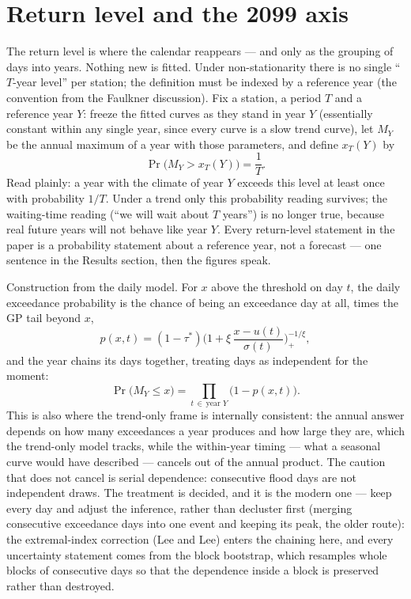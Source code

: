 \documentclass[11pt]{article}
\begin{document}
\section{Return level and the 2099 axis}\label{sec:rl}

The return level is where the calendar reappears --- and only as the grouping of days into years. Nothing new is fitted. Under non-stationarity there is no single ``$T$-year level'' per station; the definition must be indexed by a reference year (the convention from the Faulkner discussion). Fix a station, a period $T$ and a reference year $Y$: freeze the fitted curves as they stand in year $Y$ (essentially constant within any single year, since every curve is a slow trend curve), let $M_Y$ be the annual maximum of a year with those parameters, and define $x_T(Y)$ by
\begin{equation}\label{eq:rl}
\Pr\bigl(M_Y > x_T(Y)\bigr) = \frac{1}{T}.
\end{equation}
Read plainly: a year with the climate of year $Y$ exceeds this level at least once with probability $1/T$. Under a trend only this probability reading survives; the waiting-time reading (``we will wait about $T$ years'') is no longer true, because real future years will not behave like year $Y$. Every return-level statement in the paper is a probability statement about a reference year, not a forecast --- one sentence in the Results section, then the figures speak.

Construction from the daily model. For $x$ above the threshold on day $t$, the daily exceedance probability is the chance of being an exceedance day at all, times the GP tail beyond $x$,
\begin{equation}\label{eq:pxt}
p(x, t) = (1 - \tau^{*}) \biggl(1 + \xi\, \frac{x - u(t)}{\sigma(t)}\biggr)_{\!+}^{-1/\xi},
\end{equation}
and the year chains its days together, treating days as independent for the moment:
\begin{equation}\label{eq:annual}
\Pr\bigl(M_Y \le x\bigr) = \prod_{t\, \in\, \text{year } Y} \bigl(1 - p(x, t)\bigr).
\end{equation}
This is also where the trend-only frame is internally consistent: the annual answer depends on how many exceedances a year produces and how large they are, which the trend-only model tracks, while the within-year timing --- what a seasonal curve would have described --- cancels out of the annual product. The caution that does not cancel is serial dependence: consecutive flood days are not independent draws. The treatment is decided, and it is the modern one --- keep every day and adjust the inference, rather than decluster first (merging consecutive exceedance days into one event and keeping its peak, the older route): the extremal-index correction (Lee and Lee) enters the chaining here, and every uncertainty statement comes from the block bootstrap, which resamples whole blocks of consecutive days so that the dependence inside a block is preserved rather than destroyed.
\end{document}
